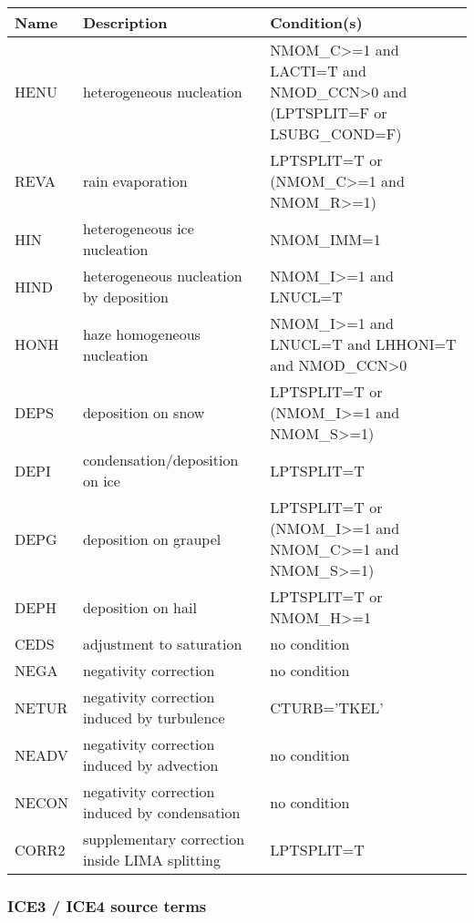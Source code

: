 \begin{longtable} {|p{}|p{}|p{}|}
\hline
Name & Description & Condition(s) \\
\hline \hline
\endhead
HENU   & heterogeneous nucleation                       & NMOM\_C>=1 and LACTI=T and NMOD\_CCN>0 and (LPTSPLIT=F or LSUBG\_COND=F) \\\hline
REVA   & rain evaporation                               & LPTSPLIT=T or (NMOM\_C>=1 and NMOM\_R>=1) \\\hline
HIN    & heterogeneous ice nucleation                   & NMOM\_IMM=1 \\\hline
HIND   & heterogeneous nucleation by deposition         & NMOM\_I>=1 and LNUCL=T \\\hline
HONH   & haze homogeneous nucleation                    & NMOM\_I>=1 and LNUCL=T and LHHONI=T and NMOD\_CCN>0 \\\hline
DEPS   & deposition on snow                             & LPTSPLIT=T or (NMOM\_I>=1 and NMOM\_S>=1) \\\hline
DEPI   & condensation/deposition on ice                 & LPTSPLIT=T \\\hline
DEPG   & deposition on graupel                          & LPTSPLIT=T or (NMOM\_I>=1 and NMOM\_C>=1 and NMOM\_S>=1) \\\hline
DEPH   & deposition on hail                             & LPTSPLIT=T or NMOM\_H>=1 \\\hline
CEDS   & adjustment to saturation                       & no condition \\\hline
NEGA   & negativity correction                          & no condition \\\hline
NETUR  & negativity correction induced by turbulence    & CTURB='TKEL' \\\hline
NEADV  & negativity correction induced by advection     & no condition \\\hline
NECON  & negativity correction induced by condensation  & no condition \\\hline
CORR2  & supplementary correction inside LIMA splitting & LPTSPLIT=T \\\hline
\end{longtable}

\subsubsection{ICE3 / ICE4 source terms}

